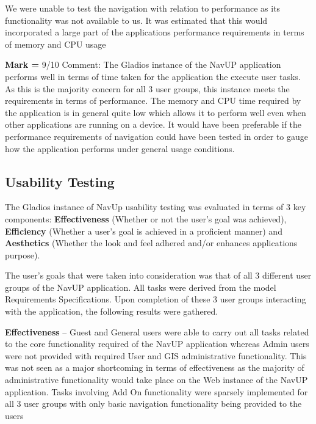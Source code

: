 \documentclass{article}
\begin{document}
		 	\cleardoublepage
		
		We were unable to test the navigation with relation to performance as its functionality was not available to us. It was estimated that this would incorporated a large part of the applications performance requirements in terms of memory and CPU usage \newline
		
		\textbf{Mark =} 9/10 \newline
		Comment: The Gladios instance of the NavUP application performs well in terms of time taken for the application the execute user tasks. As this is the majority concern for all 3 user groups, this instance meets the requirements in terms of performance. The memory and CPU time required by the application is in general quite low which allows it to perform well even when other applications are running on a device. It would have been preferable if the performance requirements of navigation could have been tested in order to gauge how the application performs under general usage conditions.
		
		\subsection{Usability Testing}\label{subsec:usabilty}  
		
		The Gladios instance of NavUp usability testing was evaluated in terms of 3 key components: \textbf{Effectiveness} (Whether or not the user’s goal was achieved), \textbf{Efficiency} (Whether a user’s goal is achieved in a proficient manner) and \textbf{Aesthetics} (Whether the look and feel adhered and/or enhances applications purpose). \newline
		
		The user’s goals that were taken into consideration was that of all 3 different user groups of the NavUP application. All tasks were derived from the model Requirements Specifications. Upon completion of these 3 user groups interacting with the application, the following results were gathered. \newline
		
		\textbf{Effectiveness} – Guest and General users were able to carry out all tasks related to the core functionality required of the NavUP application whereas Admin users were not provided with required User and GIS administrative functionality. This was not seen as a major shortcoming in terms of effectiveness as the majority of administrative functionality would take place on the Web instance of the NavUP application. Tasks involving Add On functionality were sparsely implemented for all 3 user groups with only basic navigation functionality being provided to the users \newline
		
\end{document}
